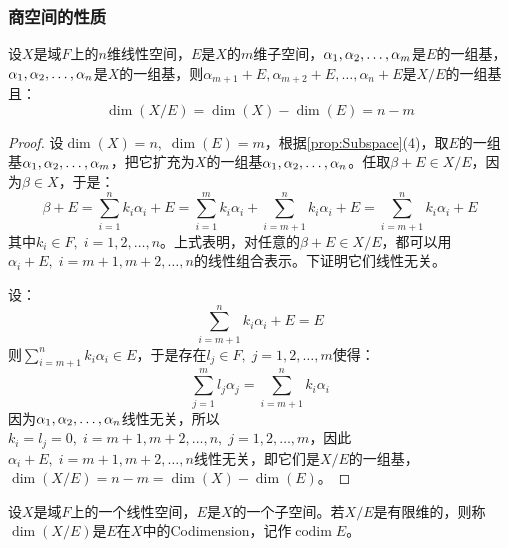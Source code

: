 \subsubsection{商空间的性质}
\begin{theorem}\label{theo:QuotientDim}
	设$X$是域$F$上的$n$维线性空间，$E$是$X$的$m$维子空间，$\alpha_1, \alpha_2, \dots, \alpha_{m}$是$E$的一组基，$\alpha_1, \alpha_2, \dots, \alpha_{n}$是$X$的一组基，则$\alpha_{m+1}+E,\alpha_{m+2}+E,\dots,\alpha_{n}+E$是$X/E$的一组基且：
	\begin{equation*}
		\dim(X/E)=\dim(X)-\dim(E)=n-m
	\end{equation*}
\end{theorem}
\begin{proof}
	设$\dim(X)=n,\;\dim(E)=m$，根据\cref{prop:Subspace}(4)，取$E$的一组基$\alpha_1, \alpha_2, \dots, \alpha_{m}$，把它扩充为$X$的一组基$\alpha_1, \alpha_2, \dots, \alpha_{n}$。任取$\beta+E\in X/E$，因为$\beta\in X$，于是：
	\begin{equation*}
		\beta+E=\sum_{i=1}^{n}k_i\alpha_i+E=\sum_{i=1}^{m}k_i\alpha_i+\sum_{i=m+1}^{n}k_i\alpha_i+E=\sum_{i=m+1}^{n}k_i\alpha_i+E
	\end{equation*}
	其中$k_i\in F,\;i=1,2,\dots,n$。上式表明，对任意的$\beta+E\in X/E$，都可以用$\alpha_i+E,\;i=m+1,m+2,\dots,n$的线性组合表示。下证明它们线性无关。\par
	设：
	\begin{equation*}
		\sum_{i=m+1}^{n}k_i\alpha_i+E=E
	\end{equation*}
	则$\sum\limits_{i=m+1}^{n}k_i\alpha_i\in E$，于是存在$l_j\in F,\;j=1,2,\dots,m$使得：
	\begin{equation*}
		\sum_{j=1}^{m}l_j\alpha_j=\sum_{i=m+1}^{n}k_i\alpha_i
	\end{equation*}
	因为$\alpha_1, \alpha_2, \dots, \alpha_{n}$线性无关，所以$k_i=l_j=0,\;i=m+1,m+2,\dots,n,\;j=1,2,\dots,m$，因此$\alpha_i+E,\;i=m+1,m+2,\dots,n$线性无关，即它们是$X/E$的一组基，$\dim(X/E)=n-m=\dim(X)-\dim(E)$。
\end{proof}
\begin{definition}
	设$X$是域$F$上的一个线性空间，$E$是$X$的一个子空间。若$X/E$是有限维的，则称$\dim(X/E)$是$E$在$X$中的\gls{Codimension}，记作$\operatorname{codim}E$。
\end{definition}
